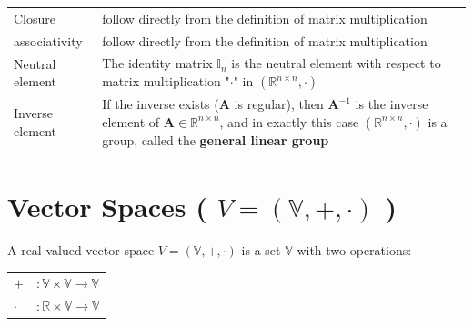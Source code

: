 \begin{customTableWrapper}{1}
\begin{table}[h]
    \begin{tabular}{l p{7cm}}
        Closure & follow directly from the definition of matrix multiplication \\
        
        associativity & follow directly from the definition of matrix multiplication \\

        Neutral element & The identity matrix $\mathbb{I}_n$ is the neutral element with respect to matrix multiplication "$\cdot$" in $(\mathbb{R}^{n\times n}, \cdot)$ \\

        Inverse element & If the inverse exists ($\mathbf{A}$ is regular), then $\mathbf{A}^{-1}$ is the inverse element of $\mathbf{A} \in \mathbb{R}^{n\times n}$, and in exactly this case $(\mathbb{R}^{n\times n}, \cdot)$ is a group, called the \textbf{general linear group}\\
        
    \end{tabular}
\end{table}
\end{customTableWrapper}














\section{Vector Spaces ( $V = (\mathbb{V}, +, \cdot)$ ) \cite{mfml-1}}\label{Vector Spaces}

A real-valued vector space $V = (\mathbb{V}, +, \cdot)$ is a set $\mathbb{V}$ with two operations:

\begin{table}[H]
    \centering
    \begin{tabular}{l l}
        $+$ & $: \mathbb{V} \times \mathbb{V} \to \mathbb{V}$ \\

        $\cdot$ & $: \mathbb{R} \times \mathbb{V} \to \mathbb{V}$ \\

    \end{tabular}
\end{table}

